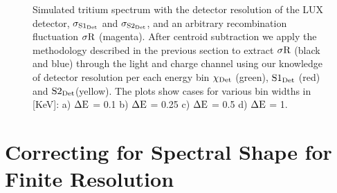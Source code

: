 \begin{figure}[h!]
\caption{Simulated tritium spectrum with the detector resolution of the LUX detector, $\rm \sigma_{S1_{Det}}$ and $\rm \sigma_{S2_{Det}}$, and an arbitrary recombination fluctuation $\rm \sigma R$ (magenta). After centroid subtraction we apply the methodology described in the previous section to extract $\rm \sigma R$ (black and blue) through the light and charge channel using our knowledge of detector resolution per each energy bin $\rm \chi_{Det}$ (green), $\rm S1_{Det}$ (red) and $\rm S2_{Det} $(yellow). The plots show cases for various bin widths in [KeV]: a) $\rm \Delta E$ = 0.1 b) $\rm \Delta E$ = 0.25 c) $\rm \Delta E$ = 0.5 d) $\rm \Delta E$ = 1.   }
\label{fig:T_Var}
\end{figure}%


\newpage
\section{Correcting for Spectral Shape for Finite Resolution}
\label{sec:Smear}

 

